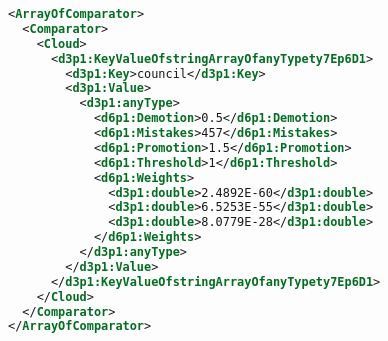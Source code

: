 \begin{lstlisting}[language=xml]
<ArrayOfComparator>
  <Comparator>
    <Cloud>
      <d3p1:KeyValueOfstringArrayOfanyTypety7Ep6D1>
        <d3p1:Key>council</d3p1:Key>
        <d3p1:Value>
          <d3p1:anyType>
            <d6p1:Demotion>0.5</d6p1:Demotion>
            <d6p1:Mistakes>457</d6p1:Mistakes>
            <d6p1:Promotion>1.5</d6p1:Promotion>
            <d6p1:Threshold>1</d6p1:Threshold>
            <d6p1:Weights>
              <d3p1:double>2.4892E-60</d3p1:double>
              <d3p1:double>6.5253E-55</d3p1:double>
              <d3p1:double>8.0779E-28</d3p1:double>
            </d6p1:Weights>
          </d3p1:anyType>
        </d3p1:Value>
      </d3p1:KeyValueOfstringArrayOfanyTypety7Ep6D1>
    </Cloud>
  </Comparator>
</ArrayOfComparator>
\end{lstlisting}
